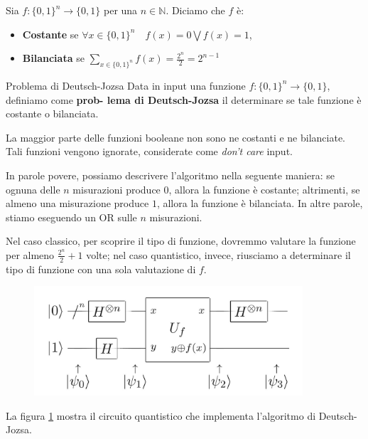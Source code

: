 Sia $f : \{0, 1\}^n \rightarrow \{0, 1\}$ per una $n \in \mathbb{N}$. Diciamo che $f$ è:
\begin{itemize}
    \item \textbf{Costante} se $\forall x \in \{0,1\}^n \quad f(x)=0 \bigvee f(x)=1$,
    \item \textbf{Bilanciata} se $\sum_{x \in \{0,1\}^n} f(x) = \frac{2^n}{2} = 2^{n-1}$
\end{itemize}
\begin{definition}{Problema di Deutsch-Jozsa}{}
    Data in input una funzione $f : \{0, 1\}^n \rightarrow \{0, 1\}$, definiamo come \textbf{prob-
    lema di Deutsch-Jozsa} il determinare se tale funzione è costante o bilanciata.
\end{definition}
\begin{oss}{}{}
    La maggior parte delle funzioni booleane non sono ne costanti e ne bilanciate. Tali funzioni
    vengono ignorate, considerate come \textit{don't care} input.
\end{oss}
In parole povere, possiamo descrivere l'algoritmo nella seguente maniera: se ognuna delle $n$ misurazioni
produce $0$, allora la funzione è costante; altrimenti, se almeno una misurazione produce $1$, allora la funzione
è bilanciata. In altre parole, stiamo eseguendo un OR sulle $n$ misurazioni.

Nel caso classico, per scoprire il tipo di funzione, dovremmo valutare la funzione per almeno $\frac{2^n}{2} + 1$
volte; nel caso quantistico, invece, riusciamo a determinare il tipo di funzione con una sola valutazione di $f$.

\begin{figure}[h]
    \centering
    \includegraphics[width = 10cm]{./Images/dh.jpeg}
    \caption{}
    \label{fig16}
\end{figure}

La figura \ref{fig16} mostra il circuito quantistico che implementa l'algoritmo di Deutsch-Jozsa.